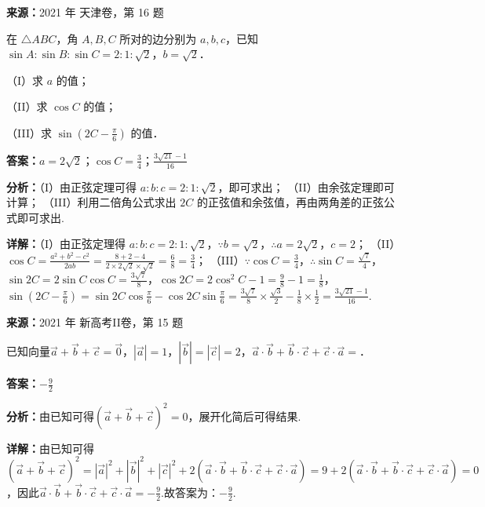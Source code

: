 \begin{question}[points=14]
\textbf{来源：}2021 年 天津卷，第 16 题\par
在 $\triangle ABC$，角 $A, B, C$ 所对的边分别为 $a, b, c$，已知 $\sin A : \sin B : \sin C = 2 : 1 : \sqrt{2}$，$b = \sqrt{2}$．

（I）求 $a$ 的值；

（II）求 $\cos C$ 的值；

（III）求 $\sin\left(2C - \frac{\pi}{6}\right)$ 的值．
\begin{solution}
\textbf{答案：}$a=2\sqrt{2}$；$\cos C = \frac{3}{4}$；$\frac{3\sqrt{21}-1}{16}$

\textbf{分析：}（I）由正弦定理可得 $a:b:c = 2:1:\sqrt{2}$，即可求出；
（II）由余弦定理即可计算；
（III）利用二倍角公式求出 $2C$ 的正弦值和余弦值，再由两角差的正弦公式即可求出.

\textbf{详解：}（I）由正弦定理得 $a:b:c = 2:1:\sqrt{2}$，$\because b = \sqrt{2}$，$\therefore a = 2\sqrt{2}$，$c=2$；
（II）$\cos C = \frac{a^2+b^2-c^2}{2ab} = \frac{8+2-4}{2\times 2\sqrt{2}\times \sqrt{2}} = \frac{6}{8} = \frac{3}{4}$；
（III）$\because \cos C = \frac{3}{4}$，$\therefore \sin C = \frac{\sqrt{7}}{4}$，$\sin 2C = 2\sin C \cos C = \frac{3\sqrt{7}}{8}$，$\cos 2C = 2\cos^2 C -1 = \frac{9}{8}-1 = \frac{1}{8}$，$\sin\left(2C - \frac{\pi}{6}\right) = \sin 2C \cos \frac{\pi}{6} - \cos 2C \sin \frac{\pi}{6} = \frac{3\sqrt{7}}{8} \times \frac{\sqrt{3}}{2} - \frac{1}{8} \times \frac{1}{2} = \frac{3\sqrt{21} - 1}{16}$.
\end{solution}
\end{question}

\begin{question}[points=5]
\textbf{来源：}2021 年 新高考II卷，第 15 题\par
已知向量$\vec{a}+\vec{b}+\vec{c}=\vec{0}$，$|\vec{a}|=1$，$|\vec{b}|=|\vec{c}|=2$，$\vec{a}\cdot\vec{b}+\vec{b}\cdot\vec{c}+\vec{c}\cdot\vec{a}=$．
\fillin[{$-\frac{9}{2}$}]
\begin{solution}
\textbf{答案：}$-\frac{9}{2}$

\textbf{分析：}由已知可得$(\vec{a}+\vec{b}+\vec{c})^2=0$，展开化简后可得结果.

\textbf{详解：}由已知可得$(\vec{a}+\vec{b}+\vec{c})^2=|\vec{a}|^2+|\vec{b}|^2+|\vec{c}|^2+2(\vec{a}\cdot\vec{b}+\vec{b}\cdot\vec{c}+\vec{c}\cdot\vec{a})=9+2(\vec{a}\cdot\vec{b}+\vec{b}\cdot\vec{c}+\vec{c}\cdot\vec{a})=0$，因此$\vec{a}\cdot\vec{b}+\vec{b}\cdot\vec{c}+\vec{c}\cdot\vec{a}=-\frac{9}{2}$.故答案为：$-\frac{9}{2}$.
\end{solution}
\end{question}

